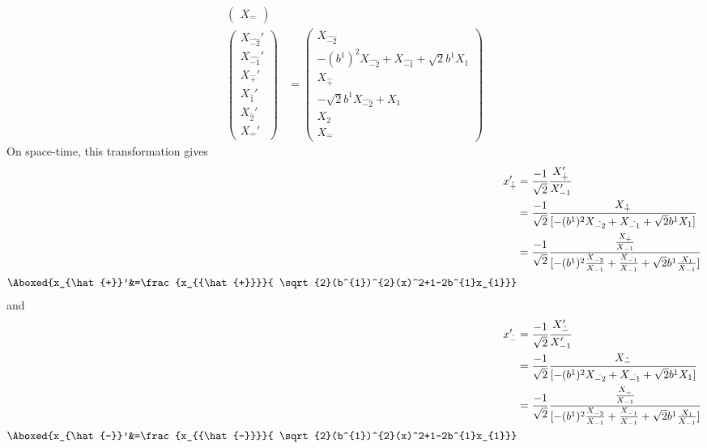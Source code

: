 \documentclass[]{article}
\numberwithin{equation}{section}
\begin{document}
{{\begin{align}
\begin{pmatrix}
    {X}_{\hat{-}}
    \end{pmatrix}\\
    \begin{pmatrix}
    {X}_{\hat{-2}}'\\
    {X}_{\hat{-1}}'\\
    {X}_{\hat{+}}'\\
    {X}_{\hat{1}}'\\
    {X}_{\hat{2}}'\\
    {X}_{\hat{-}}'
    \end{pmatrix}&= \begin{pmatrix}
    {X}_{\hat{-2}}\\
    -(b^{1})^{2}{X}_{\hat{-2}}+{X}_{\hat{-1}}+\sqrt{2}b^{1}{X}_{1}\\
    {X}_{\hat{+}}\\
    -\sqrt{2}b^{1} {X}_{\hat{-2}}+{X}_{1}\\
    {X}_{2}\\
    {X}_{\hat{-}}
    \end{pmatrix}
\end{align}
On space-time, this transformation gives
\begin{align}
    x_{\hat{+}}'&=\frac{-1}{\sqrt{2}}\frac{{X}_{{\hat{+}}}'}{ {X}_{-1}'}\\
   &=\frac{-1}{\sqrt{2}}\frac{{X}_{{\hat{+}}}}{[ -(b^{1})^{2}{X}_{\hat{-2}}+{X}_{\hat{-1}}+\sqrt{2}b^{1}{X}_{1}]}\\
   &=\frac{-1}{\sqrt{2}}\frac{\frac{{X}_{{\hat{+}}}}{{X}_{-1}}}{[ -(b^{1})^{2}\frac{{X}_{\hat{-2}}}{{X}_{-1}}+\frac{{X}_{\hat{-1}}}{{X}_{-1}}+\sqrt{2}b^{1}\frac{{X}_{1}}{{X}_{-1}}]}\\
    \Aboxed{x_{\hat{+}}'&=\frac{x_{{\hat{+}}}}{ \sqrt{2}(b^{1})^{2}(x)^2+1-2b^{1}x_{1}}}
\end{align}
and
\begin{align}
    x_{\hat{-}}'&=\frac{-1}{\sqrt{2}}\frac{{X}_{{\hat{-}}}'}{ {X}_{-1}'}\\
   &=\frac{-1}{\sqrt{2}}\frac{{X}_{{\hat{-}}}}{[ -(b^{1})^{2}{X}_{\hat{-2}}+{X}_{\hat{-1}}+\sqrt{2}b^{1}{X}_{1}]}\\
   &=\frac{-1}{\sqrt{2}}\frac{\frac{{X}_{{\hat{-}}}}{{X}_{-1}}}{[ -(b^{1})^{2}\frac{{X}_{\hat{-2}}}{{X}_{-1}}+\frac{{X}_{\hat{-1}}}{{X}_{-1}}+\sqrt{2}b^{1}\frac{{X}_{1}}{{X}_{-1}}]}\\
    \Aboxed{x_{\hat{-}}'&=\frac{x_{{\hat{-}}}}{ \sqrt{2}(b^{1})^{2}(x)^2+1-2b^{1}x_{1}}}
\end{align}


}}
\end{document}
